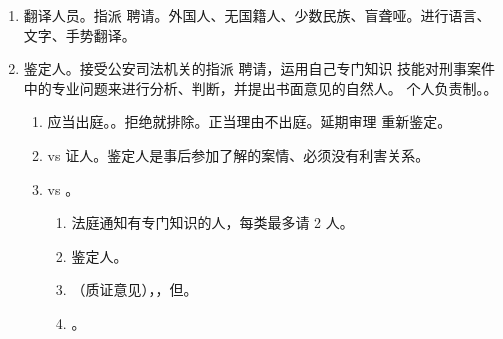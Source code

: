 \begin{enumerate}
\begin{enumerate}
\begin{enumerate}
                \end{enumerate}
        \end{enumerate}
  \item 翻译人员。指派 \hz 聘请。外国人、无国籍人、少数民族、盲聋哑。进行语言、文字、手势翻译。
  \item 鉴定人。接受公安司法机关的指派 \hz 聘请，运用自己专门知识 \hz 技能对刑事案件中的专业问题来进行分析、判断，并提出书面意见的自然人。
        个人负责制。。
        \begin{enumerate}
          \item 应当出庭。。\yi 拒绝就排除。\er 正当理由不出庭。延期审理 \hz 重新鉴定。
          \item vs 证人。鉴定人是事后参加了解的案情、必须没有利害关系。
          \item vs 。
                \begin{enumerate}
                  \item {}法庭通知有专门知识的人，每类最多请 2 人。
                  \item {}鉴定人。
                  \item {}（质证意见），，但。
                  \item {}。
                \end{enumerate}
        \end{enumerate}
\end{enumerate}
